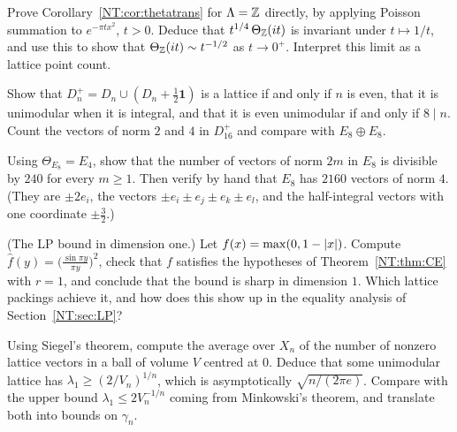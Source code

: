 \begin{exercise}
Prove Corollary~\ref{NT:cor:thetatrans} for $\Lambda=\mathbb{Z}$ directly, by applying Poisson summation to
$e^{-\pi tx^2}$, $t>0$. Deduce that $t^{1/4}\,\Theta_{\mathbb{Z}}(it)$ is invariant under $t\mapsto1/t$, and use this to
show that $\Theta_{\mathbb{Z}}(it)\sim t^{-1/2}$ as $t\to0^+$. Interpret this limit as a lattice point count.
\end{exercise}

\begin{exercise}\label{NT:ex:D16}
Show that $D_n^+=D_n\cup(D_n+\frac12\mathbf 1)$ is a lattice if and only if $n$ is even, that it is
unimodular when it is integral, and that it is even unimodular if and only if $8\mid n$. Count the vectors of
norm $2$ and $4$ in $D_{16}^+$ and compare with $E_8\oplus E_8$.
\end{exercise}

\begin{exercise}
Using $\Theta_{E_8}=E_4$, show that the number of vectors of norm $2m$ in $E_8$ is divisible by $240$ for every $m\ge1$.
Then verify by hand that $E_8$ has $2160$ vectors of norm $4$. (They are $\pm2e_i$, the vectors
$\pm e_i\pm e_j\pm e_k\pm e_l$, and the half-integral vectors with one coordinate $\pm\frac32$.)
\end{exercise}

\begin{exercise}
(The LP bound in dimension one.) Let $f(x)=\max(0,1-\left\lvert x \right\rvert)$. Compute $\hat f(y)=\big(\frac{\sin\pi y}{\pi y}\big)^2$,
check that $f$ satisfies the hypotheses of Theorem~\ref{NT:thm:CE} with $r=1$, and conclude that the bound is
sharp in dimension $1$. Which lattice packings achieve it, and how does this show up in the equality analysis of
Section~\ref{NT:sec:LP}?
\end{exercise}

\begin{exercise}
Using Siegel's theorem, compute the average over $X_n$ of the number of nonzero lattice vectors in a ball
of volume $V$ centred at $0$. Deduce that some unimodular lattice has $\lambda_1\ge(2/V_n)^{1/n}$, which is
asymptotically $\sqrt{n/(2\pi e)}$. Compare with the upper bound $\lambda_1\le2V_n^{-1/n}$ coming from
Minkowski's theorem, and translate both into bounds on $\gamma_n$.
\end{exercise}

